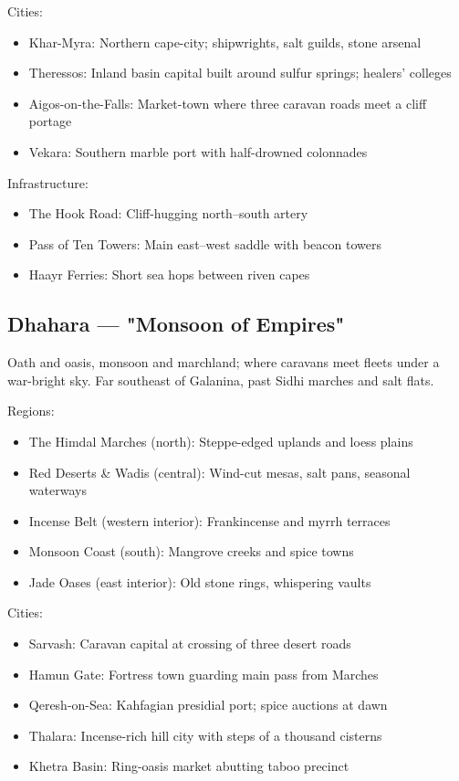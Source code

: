 Cities:
\begin{itemize}
    \item Khar-Myra: Northern cape-city; shipwrights, salt guilds, stone arsenal
    \item Theressos: Inland basin capital built around sulfur springs; healers' colleges
    \item Aigos-on-the-Falls: Market-town where three caravan roads meet a cliff portage
    \item Vekara: Southern marble port with half-drowned colonnades
\end{itemize}

Infrastructure:
\begin{itemize}
    \item The Hook Road: Cliff-hugging north–south artery
    \item Pass of Ten Towers: Main east–west saddle with beacon towers
    \item Haayr Ferries: Short sea hops between riven capes
\end{itemize}

\subsection{Dhahara — "Monsoon of Empires"}
\label{sec:dhahara}

Oath and oasis, monsoon and marchland; where caravans meet fleets under a war-bright sky. Far southeast of Galanina, past Sidhi marches and salt flats.

Regions:
\begin{itemize}
    \item The Himdal Marches (north): Steppe-edged uplands and loess plains
    \item Red Deserts \& Wadis (central): Wind-cut mesas, salt pans, seasonal waterways
    \item Incense Belt (western interior): Frankincense and myrrh terraces
    \item Monsoon Coast (south): Mangrove creeks and spice towns
    \item Jade Oases (east interior): Old stone rings, whispering vaults
\end{itemize}

Cities:
\begin{itemize}
    \item Sarvash: Caravan capital at crossing of three desert roads
    \item Hamun Gate: Fortress town guarding main pass from Marches
    \item Qeresh-on-Sea: Kahfagian presidial port; spice auctions at dawn
    \item Thalara: Incense-rich hill city with steps of a thousand cisterns
    \item Khetra Basin: Ring-oasis market abutting taboo precinct
\end{itemize}

